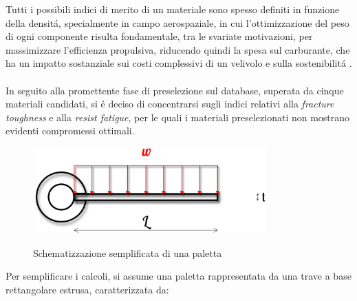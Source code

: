 \documentclass{article}
\begin{document}
        Tutti i possibili indici di merito di un materiale sono spesso definiti in funzione della densitá, specialmente in campo aerospaziale, in cui l’ottimizzazione del peso di ogni componente risulta fondamentale, tra le svariate motivazioni, per massimizzare l’efficienza propulsiva, riducendo quindi la spesa sul carburante, che ha un impatto sostanziale sui costi complessivi di un velivolo e sulla sostenibilitá \autocite{EASA_environ_report_2019}.
        \\ \\ 
        In seguito alla promettente fase di preselezione sul database,
        superata da cinque materiali candidati, si é deciso di concentrarsi sugli indici relativi alla \textit{fracture toughness} e alla \textit{resist fatigue},
        per le quali i materiali preselezionati non mostrano evidenti compromessi ottimali.

        \begin{figure}[h!]
            \centering
             \label{blade_load}
            \includegraphics[width=0.8\textwidth]{Sources/blade_load.eps}
            \caption{Schematizzazione semplificata di una paletta \autocite{Inkscape}}
        \end{figure}
        \clearpage

        Per semplificare i calcoli, si assume una paletta rappresentata da una trave a base rettangolare
        estrusa, caratterizzata da:
\end{document}
